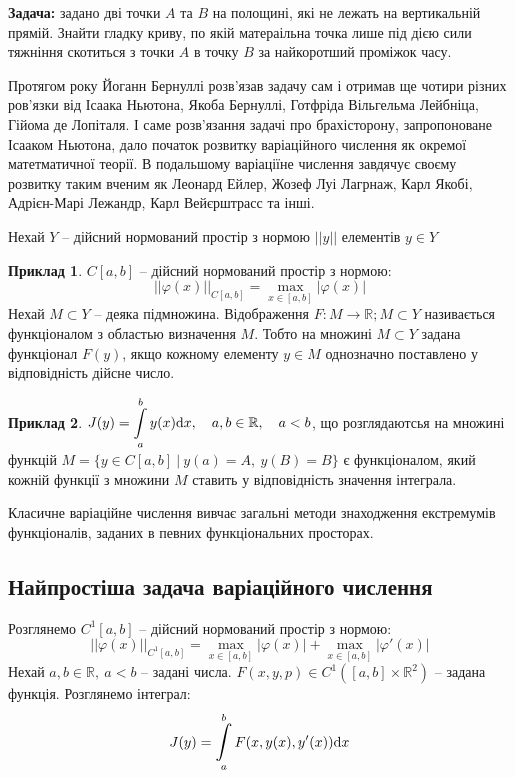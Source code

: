 \documentclass[14pt,a4paper]{scrartcl}
\theoremstyle{definition}
\newtheorem*{example}{Приклад}
\theoremstyle{definition}
\theoremstyle{definition}
\begin{document}
\textbf{Задача: } задано дві точки $A$ та $B$ на полощині, які не лежать на вертикальній прямій. Знайти гладку криву, по якій матераільна точка лише під дією сили тяжніння скотиться з точки $A$ в точку $B$ за найкоротший проміжок часу. \par Протягом року Йоганн Бернуллі розв'язав задачу сам і отримав ще чотири різних ров'язки від Ісаака Ньютона, Якоба Бернуллі, Готфріда Вільгельма Лейбніца, Гійома де Лопіталя. І саме розв'язання задачі про брахісторону, запропоноване Ісааком Ньютона, дало початок розвитку варіаційного числення як окремої матетматичної теорії. В подальшому варіаціїне числення завдячує своєму розвитку таким вченим як Леонард Ейлер, Жозеф Луі Лагрнаж, Карл Якобі, Адрієн-Марі Лежандр, Карл Вейєрштрасс та інші.\par

Нехай $Y$ -- дійсний нормований простір з нормою $||y||$ елементів $y \in Y$

\begin{example}
  $C[a, b]$ -- дійсний нормований простір з нормою: $$||\varphi(x)||_{C[a, b]} = \max\limits_{x \in [a, b]}|\varphi(x)|$$
  Нехай $M \subset Y$ -- деяка підмножина. Відображення $F: M \rightarrow \mathbb{R}; M \subset Y$ називається функціоналом з областью визначення $M$. Тобто на множині $M \subset Y$ задана функціонал $F(y)$, якщо кожному елементу $y \in M$ однозначно поставлено у відповідність дійсне число.
\end{example}
\begin{example}
  $J(y) = \mathop{\mathlarger{\int}}\limits_{a}^{b}y(x)\mathrm{d}x, \quad a, b \in \mathbb{R}, \quad a < b$, що розглядаютсья на множині функцій $M = \{ y \in C[a,b] \  | \  y(a) = A, \ y(B) = B\}$ є функціоналом, який кожній функції з множини $M$ ставить у відповідність значення інтеграла.
\end{example}
Класичне варіаційне числення вивчає загальні методи знаходження екстремумів функціоналів, заданих в певних функціональних просторах.

\subsection{Найпростіша задача варіаційного числення}
Розглянемо $C^1[a, b]$ -- дійсний нормований простір з нормою:
$$||\varphi(x)||_{C^1[a, b]} = \max\limits_{x \in [a, b]}|\varphi(x)| + \max\limits_{x \in [a, b]}|\varphi'(x)|$$
Нехай $a, b \in \mathbb{R}, \ a < b$ -- задані числа. $F(x, y, p) \in C^1([a, b] \times \mathbb{R}^2)$ -- задана функція. Розглянемо інтеграл:
\begin{equation}\label{varcalc_f1}
  J(y) = \mathop{\mathlarger{\int}}\limits_{a}^{b}F(x, y(x), y'(x))\mathrm{d}x
\end{equation}
\end{document}
